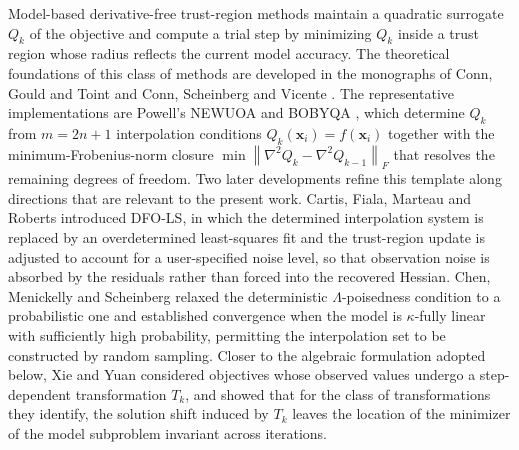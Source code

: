 \documentclass[11pt,a4paper]{article}
\newcommand{\norm}[1]{\left\| #1 \right\|}
\begin{document}
Model-based derivative-free trust-region methods maintain a quadratic
surrogate $Q_k$ of the objective and compute a trial step by
minimizing $Q_k$ inside a trust region whose radius reflects the
current model accuracy. The theoretical foundations of this class of
methods are developed in the monographs of Conn, Gould and Toint
\cite{ConnGouldToint2000} and Conn, Scheinberg and Vicente
\cite{ConnScheinbergVicente2009}. The representative implementations
are Powell's NEWUOA \cite{Powell2006NEWUOA} and BOBYQA
\cite{Powell2009BOBYQA}, which determine $Q_k$ from $m = 2n+1$
interpolation conditions $Q_k(\bm{x}_i) = f(\bm{x}_i)$ together with
the minimum-Frobenius-norm closure
$\min\norm{\nabla^2 Q_k - \nabla^2 Q_{k-1}}_F$ that resolves the
remaining degrees of freedom. Two later developments refine this
template along directions that are relevant to the present work.
Cartis, Fiala, Marteau and Roberts \cite{CartisRoberts2019}
introduced DFO-LS, in which the determined interpolation system is
replaced by an overdetermined least-squares fit and the trust-region
update is adjusted to account for a user-specified noise level, so
that observation noise is absorbed by the residuals rather than
forced into the recovered Hessian. Chen, Menickelly and Scheinberg
\cite{ChenMenickelly2018} relaxed the deterministic
$\Lambda$-poisedness condition to a probabilistic one and established
convergence when the model is $\kappa$-fully linear with sufficiently
high probability, permitting the interpolation set to be constructed
by random sampling. Closer to the algebraic formulation adopted
below, Xie and Yuan \cite{Xie2025DFOp} considered objectives whose
observed values undergo a step-dependent transformation $T_k$, and
showed that for the class of transformations they identify, the
solution shift induced by $T_k$ leaves the location of the
minimizer of the model subproblem invariant across iterations.
\end{document}
